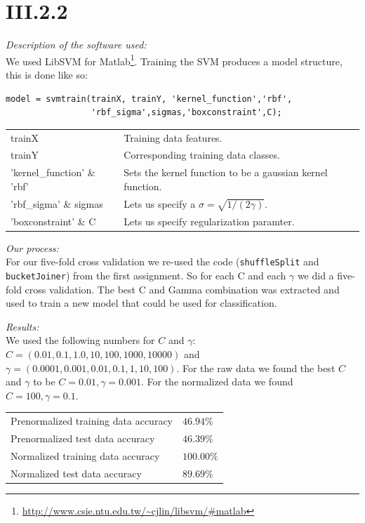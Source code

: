 \section*{III.2.2}

\textit{Description of the software used:}\\
We used LibSVM for
Matlab\footnote{\url{http://www.csie.ntu.edu.tw/\~cjlin/libsvm/\#matlab}}.
Training the SVM produces a model structure, this is done like so:
\begin{verbatim}
model = svmtrain(trainX, trainY, 'kernel_function','rbf',
                 'rbf_sigma',sigmas,'boxconstraint',C);
\end{verbatim}


\begin{tabular}{|l l|}
\hline
trainX                      & Training data features.\\
trainY                      & Corresponding training data classes.\\
'kernel\_function' \& 'rbf' & Sets the kernel function to be a gaussian kernel function.\\
'rbf\_sigma' \& sigmas      & Lets us specify a $\sigma = \sqrt{1/(2\gamma)}$.\\
'boxconstraint' \& C        & Lets us specify regularization paramter.\\\hline
\end{tabular}

\noindent \textit{Our process:}\\
For our five-fold cross validation we re-used the code (\texttt{shuffleSplit}
and \texttt{bucketJoiner}) from the first assignment. So for each C and each
$\gamma$ we did a five-fold cross validation. The best C and Gamma combination
was extracted and used to train a new model that could be used for
classification.

\noindent \textit{Results:}\\
We used the following numbers for $C$ and $\gamma$: $C = (0.01, 0.1, 1.0, 10,
100, 1000, 10000)$ and $\gamma = (0.0001, 0.001, 0.01, 0.1, 1, 10, 100)$. For
the raw data we found the best $C$ and $\gamma$ to be $C=0.01,
\gamma=0.001$. For the normalized data we found $C=100, \gamma=0.1$.

\begin{tabular}{l l}
Prenormalized training data accuracy & $ 46.94\%$\\
Prenormalized test data accuracy     & $ 46.39\%$\\
Normalized training data accuracy    & $100.00\%$\\
Normalized test data accuracy        & $ 89.69\%$\\
\end{tabular}

